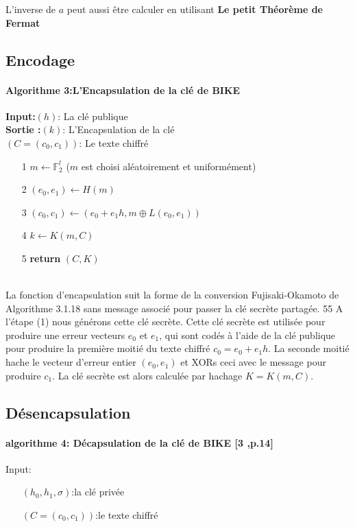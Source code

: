 \documentclass[12pt,openany]{report}
\begin{document}
L'inverse de $a$ peut aussi être calculer en utilisant \textbf{Le petit Théorème de Fermat}



\subsection{Encodage}

\paragraph{Algorithme 3:L'Encapsulation de la clé de BIKE\\}

\textbf{Input:$(h)$}: La clé publique\\
\textbf{ Sortie :$(k)$}: L'Encapsulation de la clé\\
\textbf{$(\mathit{C}=(c_0,c_1))$}: Le texte chiffré\\
\begin{itemize}
\item[1] $ m \gets \mathbb{F}_2^l$ \Comment($m$ est choisi aléatoirement et uniformément)
\item[2]$(e_0,e_1)\gets  \mathit{H}(m)$
\item[3] $(c_0,c_1)\gets (e_0+e_1h,m\oplus \mathit{L}(e_0,e_1))$
\item[4] $k \gets \mathit{K}(m,\mathit{C})$
\item[5] \textbf{return} $\mathit{(C,K)} $

\end{itemize}

\noindent\hrulefill\\

La fonction d'encapsulation suit la forme de la conversion Fujisaki-Okamoto de
Algorithme 3.1.18 sans message associé pour passer la clé secrète partagée.
55
A l'étape (1) nous générons cette clé secrète. Cette clé secrète est utilisée pour produire une erreur
vecteurs $e_0$ et $e_1$, qui sont codés à l'aide de la clé publique pour produire la première moitié du texte chiffré $c_0 = e_0 + e_1h$. La seconde moitié hache le vecteur d'erreur entier $(e_0, e_1)$
et XORs ceci avec le message pour produire $c_1$. La clé secrète est alors calculée par
hachage $K = K(m, C).$

\subsection{Désencapsulation}

\paragraph{algorithme 4: Décapsulation de la clé de BIKE [3 ,p.14]\\}
Input:\begin{itemize}
\item[]$(h_0,h_1,\sigma)$:la clé privée
\item[] $(\mathit{C}=(c_0,c_1))$:le texte chiffré

\end{itemize}
\end{document}
